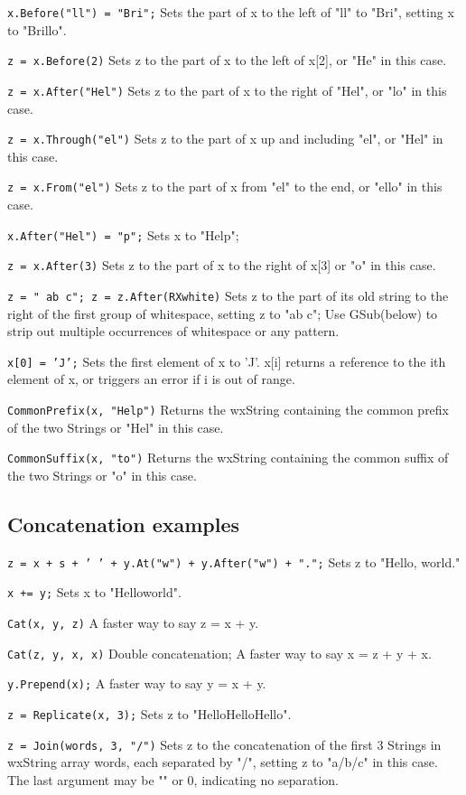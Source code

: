{\tt x.Before("ll") = "Bri";} 
Sets the part of x to the left of "ll" to "Bri", setting x to
"Brillo".

{\tt z = x.Before(2)} 
Sets z to the part of x to the left of x[2], or "He" in this case.

{\tt z = x.After("Hel")} 
Sets z to the part of x to the right of "Hel", or "lo" in this
case.

{\tt z = x.Through("el")} 
Sets z to the part of x up and including "el", or "Hel" in this
case.

{\tt z = x.From("el")} 
Sets z to the part of x from "el" to the end, or "ello" in this
case.

{\tt x.After("Hel") = "p";} 
Sets x to "Help";

{\tt z = x.After(3)} 
Sets z to the part of x to the right of x[3] or "o" in this case.

{\tt z = "  ab c"; z = z.After(RXwhite)} 
Sets z to the part of its old string to the right of the first
group of whitespace, setting z to "ab c"; Use GSub(below) to strip
out multiple occurrences of whitespace or any pattern.

{\tt x[0] = 'J';} 
Sets the first element of x to 'J'. x[i] returns a reference to
the ith element of x, or triggers an error if i is out of range.

{\tt CommonPrefix(x, "Help")} 
Returns the wxString containing the common prefix of the two Strings
or "Hel" in this case.

{\tt CommonSuffix(x, "to")} 
Returns the wxString containing the common suffix of the two Strings
or "o" in this case.

\subsection{Concatenation examples}

{\tt z = x + s + ' ' + y.At("w") + y.After("w") + ".";} 
Sets z to "Hello, world."

{\tt x += y;} 
Sets x to "Helloworld".

{\tt Cat(x, y, z)} 
A faster way to say z = x + y.

{\tt Cat(z, y, x, x)} 
Double concatenation; A faster way to say x = z + y + x.

{\tt y.Prepend(x);} 
A faster way to say y = x + y.

{\tt z = Replicate(x, 3);} 
Sets z to "HelloHelloHello".

{\tt z = Join(words, 3, "/")} 
Sets z to the concatenation of the first 3 Strings in wxString array
words, each separated by "/", setting z to "a/b/c" in this case.
The last argument may be "" or 0, indicating no separation.

